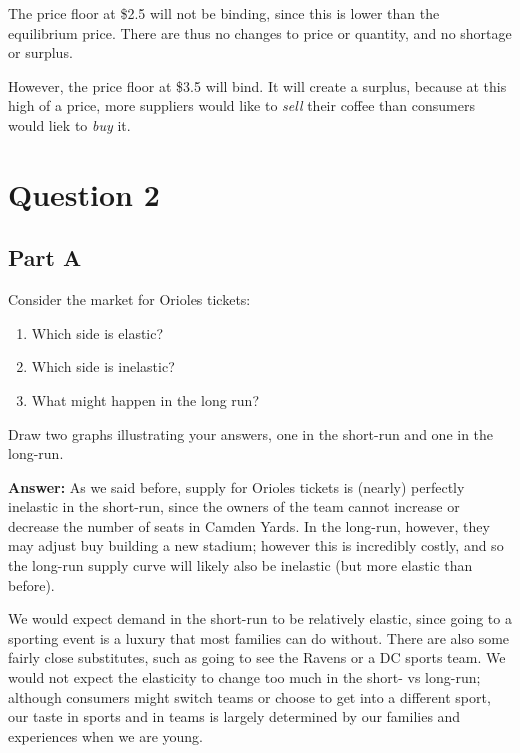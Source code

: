 \documentclass[12pt]{article}
\begin{document}
\vspace{2mm}

The price floor at \$2.5 will not be binding, since this is lower than the equilibrium price. There are thus no changes to price or quantity, and no shortage or surplus.

\vspace{2mm}

However, the price floor at \$3.5 will bind. It will create a surplus, because at this high of a price, more suppliers would like to \textit{sell} their coffee than consumers would liek to \textit{buy} it.

\section*{Question 2}

\subsection*{Part A}
Consider the market for Orioles tickets:
\begin{enumerate}
    \item Which side is elastic?
    \item Which side is inelastic?
    \item What might happen in the long run?
\end{enumerate}

Draw two graphs illustrating your answers, one in the short-run and one in the long-run.

\textbf{Answer:}
As we said before, supply for Orioles tickets is (nearly) perfectly inelastic in the short-run, since the owners of the team cannot increase or decrease the number of seats in Camden Yards. In the long-run, however, they may adjust buy building a new stadium; however this is incredibly costly, and so the long-run supply curve will likely also be inelastic (but more elastic than before).

\vspace{2mm}

We would expect demand in the short-run to be relatively elastic, since going to a sporting event is a luxury that most families can do without. There are also some fairly close substitutes, such as going to see the Ravens or a DC sports team. We would not expect the elasticity to change too much in the short- vs long-run; although consumers might switch teams or choose to get into a different sport, our taste in sports and in teams is largely determined by our families and experiences when we are young. 
\end{document}
